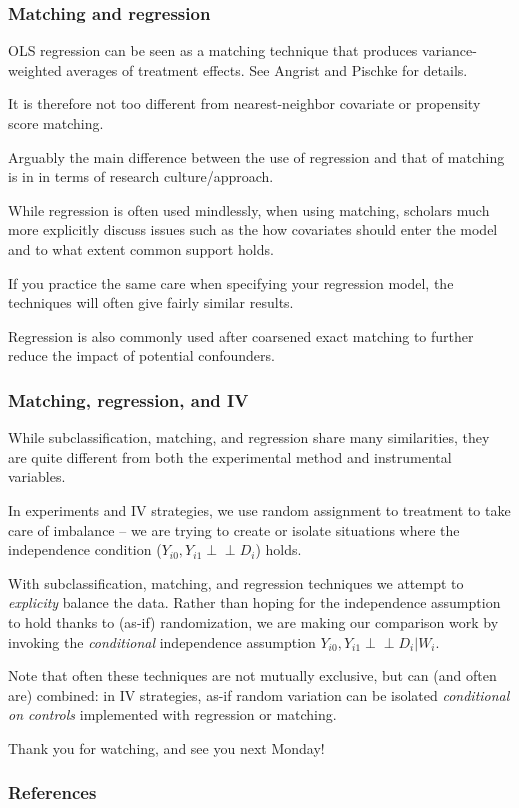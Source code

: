 \documentclass[12pt,english,dvipsnames,aspectratio=169,handout]{beamer}\usepackage[]{graphicx}\usepackage[]{xcolor}
\begin{document}
\begin{frame}
  \frametitle{Matching and regression}
\footnotesize

OLS regression can be seen as a matching technique that produces variance-weighted averages of treatment effects. See Angrist and Pischke \citeyear[54ff.]{angrist_mostly_2009} for details.

It is therefore not too different from nearest-neighbor covariate or propensity score matching.

Arguably the main difference between the use of regression and that of matching is in in terms of research culture/approach.

While regression is often used mindlessly, when using matching, scholars much more explicitly discuss issues such as the how covariates should enter the model and to what extent common support holds. 

If you practice the same care when specifying your regression model, the techniques will often give fairly similar results. 

Regression is also commonly used after coarsened exact matching to further reduce the impact of potential confounders.

\end{frame}



\begin{frame}
  \frametitle{Matching, regression, and IV}
\footnotesize

While subclassification, matching, and regression share many similarities, they are quite different from both the experimental method and instrumental variables.

In experiments and IV strategies, we use random assignment to treatment to take care of imbalance -- we are trying to create or isolate situations where the independence condition ($Y_{i0},Y_{i1} {\perp\!\!\!\perp} D_i$) holds.

With subclassification, matching, and regression techniques we attempt to \emph{explicity} balance the data. Rather than hoping for the independence assumption to hold thanks to (as-if) randomization, we are making our comparison work by invoking the \emph{conditional} independence assumption $Y_{i0},Y_{i1} {\perp\!\!\!\perp} D_i|W_i$.

Note that often these techniques are not mutually exclusive, but can (and often are) combined: in IV strategies, as-if random variation can be isolated \emph{conditional on controls} implemented with regression or matching. 

\end{frame}


\begin{frame}
\begin{center}
    \LARGE Thank you for watching, and see you next Monday!
\end{center}
\end{frame}


\begin{frame}[allowframebreaks]
\frametitle{References}

\scriptsize
\end{frame}
\end{document}
